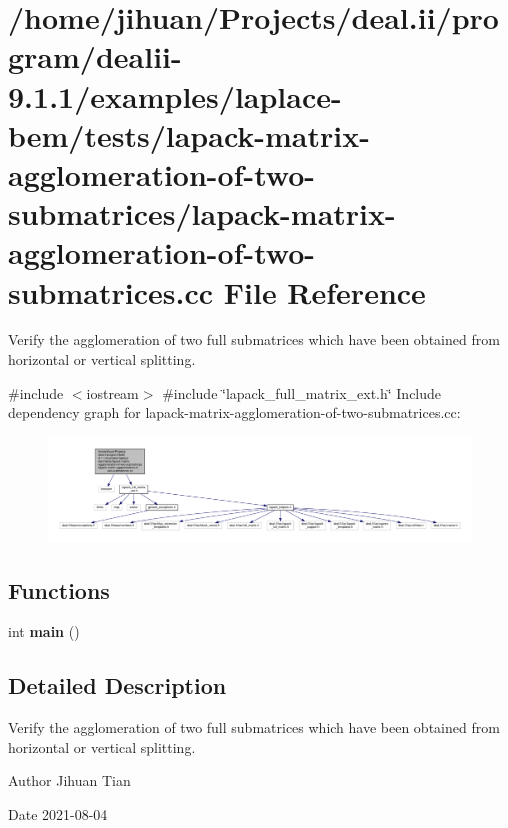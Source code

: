 \hypertarget{lapack-matrix-agglomeration-of-two-submatrices_8cc}{}\section{/home/jihuan/\+Projects/deal.ii/program/dealii-\/9.1.1/examples/laplace-\/bem/tests/lapack-\/matrix-\/agglomeration-\/of-\/two-\/submatrices/lapack-\/matrix-\/agglomeration-\/of-\/two-\/submatrices.cc File Reference}
\label{lapack-matrix-agglomeration-of-two-submatrices_8cc}


Verify the agglomeration of two full submatrices which have been obtained from horizontal or vertical splitting.  


{\ttfamily \#include $<$iostream$>$}\newline
{\ttfamily \#include \char`\"{}lapack\+\_\+full\+\_\+matrix\+\_\+ext.\+h\char`\"{}}\newline
Include dependency graph for lapack-\/matrix-\/agglomeration-\/of-\/two-\/submatrices.cc\+:\nopagebreak
\begin{figure}[H]
\begin{center}
\leavevmode
\includegraphics[width=350pt]{lapack-matrix-agglomeration-of-two-submatrices_8cc__incl}
\end{center}
\end{figure}
\subsection*{Functions}
\begin{DoxyCompactItemize}
\item 
\mbox{\label{lapack-matrix-agglomeration-of-two-submatrices_8cc_ae66f6b31b5ad750f1fe042a706a4e3d4}} 
int {\bfseries main} ()
\end{DoxyCompactItemize}


\subsection{Detailed Description}
Verify the agglomeration of two full submatrices which have been obtained from horizontal or vertical splitting. 

\begin{DoxyAuthor}{Author}
Jihuan Tian 
\end{DoxyAuthor}
\begin{DoxyDate}{Date}
2021-\/08-\/04 
\end{DoxyDate}
